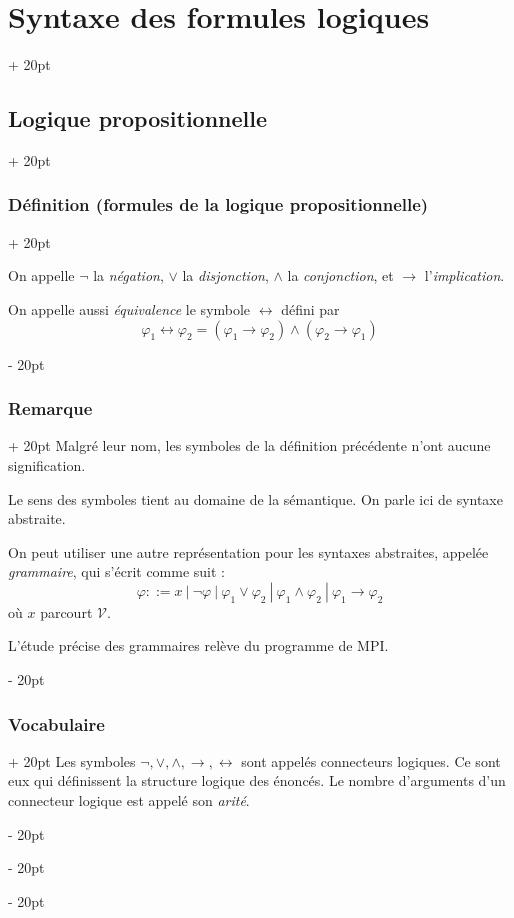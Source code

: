 \documentclass[a4paper, 12pt, twoside]{article}
\newcommand{\ind}[1][20pt]{\advance\leftskip + #1}
\newcommand{\deind}[1][20pt]{\advance\leftskip - #1}
\newenvironment{indt}[2][20pt]{#2 \par \ind[#1]}{\par \deind} %
\begin{document}
\begin{indt}{\section{Syntaxe des formules logiques}}
\begin{indt}{\subsection{Logique propositionnelle}}
\begin{indt}{\subsubsection{Définition (formules de la logique propositionnelle)}}
                \vspace{6pt}
                
                On appelle $\neg$ la \textit{négation}, $\vee$ la \textit{disjonction}, $\wedge$ la \textit{conjonction}, et $\rightarrow$ l'\textit{implication}.
                
                On appelle aussi \textit{équivalence} le symbole $\leftrightarrow$ défini par
                    \[ \varphi_1 \leftrightarrow \varphi_2 = (\varphi_1 \rightarrow \varphi_2) \wedge (\varphi_2 \rightarrow \varphi_1) \]
            \end{indt}
            
            \vspace{12pt}
            
            \begin{indt}{\subsubsection{Remarque}}
                Malgré leur nom, les symboles de la définition précédente n'ont aucune signification.
                
                Le sens des symboles tient au domaine de la sémantique. On parle ici de syntaxe abstraite.
                
                On peut utiliser une autre représentation pour les syntaxes abstraites, appelée \textit{grammaire}, qui s'écrit comme suit :
                    \[
                        \varphi ::= x \
                        |\ \neg \varphi\
                        |\ \varphi_1 \vee \varphi_2\
                        |\ \varphi_1 \wedge \varphi_2\
                        |\ \varphi_1 \rightarrow \varphi_2
                    \]
                où $x$ parcourt $\mathcal V$.
                
                L'étude précise des grammaires relève du programme de MPI.
            \end{indt}
            
            \vspace{12pt}
            
            \begin{indt}{\subsubsection{Vocabulaire}}
                Les symboles $\neg, \vee, \wedge, \rightarrow, \leftrightarrow$ sont appelés connecteurs logiques. Ce sont eux qui définissent la structure logique des énoncés. Le nombre d'arguments d'un connecteur logique est appelé son \textit{arité}.
            \end{indt}
            

\end{indt}
\end{indt}
\end{document}
